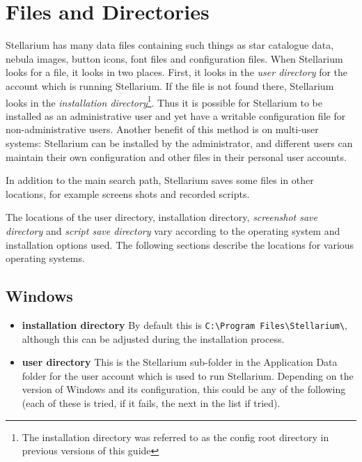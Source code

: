 \chapter{Files and Directories}\label{advanced-use}
\label{sec:FilesAndDirectories}

Stellarium has many data files containing such things as star catalogue
data, nebula images, button icons, font files and configuration files.
When Stellarium looks for a file, it looks in two places. First, it
looks in the \emph{user directory} for the account which is running
Stellarium. If the file is not found there, Stellarium looks in the
\emph{installation directory}\footnote{The installation directory was
  referred to as the config root directory in previous versions of this
  guide}. Thus it is possible for Stellarium to be installed as an
administrative user and yet have a writable configuration file for
non-administrative users. Another benefit of this method is on
multi-user systems: Stellarium can be installed by the administrator,
and different users can maintain their own configuration and other files
in their personal user accounts.

In addition to the main search path, Stellarium saves some files in
other locations, for example screens shots and recorded scripts.

The locations of the user directory, installation directory,
\emph{screenshot save directory} and \emph{script save directory} vary
according to the operating system and installation options used. The
following sections describe the locations for various operating systems.

\section{Windows}\label{windows}
\label{sec:FilesAndDirectories:Windows}

\begin{itemize}
\item
  \textbf{installation directory} By default this is
  \texttt{C:\textbackslash{}Program\ Files\textbackslash{}Stellarium\textbackslash{}},
  although this can be adjusted during the installation process.
\item
  \textbf{user directory} This is the Stellarium sub-folder in the
  Application Data folder for the user account which is used to run
  Stellarium. Depending on the version of Windows and its configuration,
  this could be any of the following (each of these is tried, if it
  fails, the next in the list if tried).
\end{itemize}

